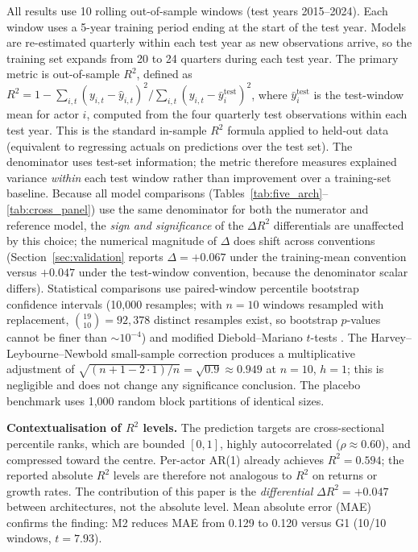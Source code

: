 \documentclass[11pt,a4paper]{article}
\begin{document}
All results use 10 rolling out-of-sample windows (test years 2015--2024). Each window uses a 5-year training period ending at the start of the test year. Models are re-estimated quarterly within each test year as new observations arrive, so the training set expands from 20 to 24 quarters during each test year. The primary metric is out-of-sample $R^2$, defined as $R^2 = 1 - \sum_{i,t}(y_{i,t} - \hat{y}_{i,t})^2 / \sum_{i,t}(y_{i,t} - \bar{y}^{\mathrm{test}}_i)^2$, where $\bar{y}^{\mathrm{test}}_i$ is the test-window mean for actor $i$, computed from the four quarterly test observations within each test year. This is the standard in-sample $R^2$ formula applied to held-out data (equivalent to regressing actuals on predictions over the test set). The denominator uses test-set information; the metric therefore measures explained variance \emph{within} each test window rather than improvement over a training-set baseline. Because all model comparisons (Tables~\ref{tab:five_arch}--\ref{tab:cross_panel}) use the same denominator for both the numerator and reference model, the \emph{sign and significance} of the $\Delta R^2$ differentials are unaffected by this choice; the numerical magnitude of $\Delta$ does shift across conventions (Section~\ref{sec:validation} reports $\Delta = +0.067$ under the \citealt{stock2002forecasting} training-mean convention versus $+0.047$ under the test-window convention, because the denominator scalar differs). Statistical comparisons use paired-window percentile bootstrap confidence intervals (10{,}000 resamples; with $n = 10$ windows resampled with replacement, $\binom{19}{10} = 92{,}378$ distinct resamples exist, so bootstrap $p$-values cannot be finer than ${\sim}10^{-4}$) and modified Diebold--Mariano $t$-tests \citep{diebold1995comparing,harvey1997testing}. The Harvey--Leybourne--Newbold small-sample correction \citep{harvey1997testing} produces a multiplicative adjustment of $\sqrt{(n + 1 - 2 \cdot 1) / n} = \sqrt{0.9} \approx 0.949$ at $n = 10$, $h = 1$; this is negligible and does not change any significance conclusion. The placebo benchmark uses 1{,}000 random block partitions of identical sizes.

\textbf{Contextualisation of $R^2$ levels.} The prediction targets are cross-sectional percentile ranks, which are bounded $[0,1]$, highly autocorrelated ($\rho \approx 0.60$), and compressed toward the centre. Per-actor AR(1) already achieves $R^2 = 0.594$; the reported absolute $R^2$ levels are therefore not analogous to $R^2$ on returns or growth rates. The contribution of this paper is the \emph{differential} $\Delta R^2 = +0.047$ between architectures, not the absolute level. Mean absolute error (MAE) confirms the finding: M2 reduces MAE from 0.129 to 0.120 versus G1 (10/10 windows, $t = 7.93$).
\end{document}
